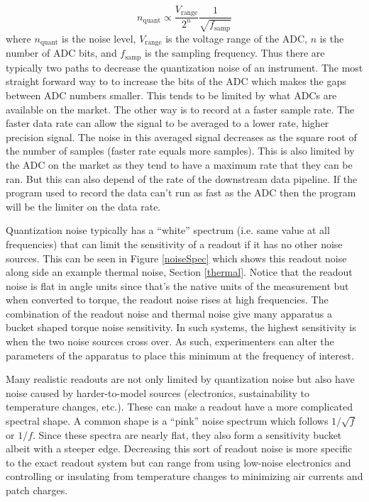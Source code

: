 \documentclass{book}
\begin{document}
\begin{equation}
n_\text{quant} \propto \frac{V_{\text{range}}}{2^n} \frac{1}{\sqrt{f_\text{samp}}}
\end{equation}
where $n_\text{quant}$ is the noise level, $V_{\text{range}}$ is the voltage range of the ADC, $n$ is the number of ADC bits, and $f_\text{samp}$ is the sampling frequency. Thus there are typically two paths to decrease the quantization noise of an instrument. The most straight forward way to to increase the bits of the ADC which makes the gaps between ADC numbers smaller. This tends to be limited by what ADCs are available on the market. The other way is to record at a faster sample rate. The faster data rate can allow the signal to be averaged to a lower rate, higher precision signal. The noise in this averaged signal decreases as the square root of the number of samples (faster rate equals more samples). This is also limited by the ADC on the market as they tend to have a maximum rate that they can be ran. But this can also depend of the rate of the downstream data pipeline. If the program used to record the data can't run as fast as the ADC then the program will be the limiter on the data rate.

Quantization noise typically has a ``white'' spectrum (i.e. same value at all frequencies) that can limit the sensitivity of a readout if it has no other noise sources. This can be seen in Figure \ref{noiseSpec} which shows this readout noise along side an example thermal noise, Section \ref{thermal}. Notice that the readout noise is flat in angle units since that's the native units of the measurement but when converted to torque, the readout noise rises at high frequencies. The combination of the readout noise and thermal noise give many apparatus a bucket shaped torque noise sensitivity. In such systems, the highest sensitivity is when the two noise sources cross over. As such, experimenters can alter the parameters of the apparatus to place this minimum at the frequency of interest.

Many realistic readouts are not only limited by quantization noise but also have noise caused by harder-to-model sources (electronics, sustainability to temperature changes, etc.). These can make a readout have a more complicated spectral shape. A common shape is a ``pink'' noise spectrum which follows $1/\sqrt{f}$ or $1/f$. Since these spectra are nearly flat, they also form a sensitivity bucket albeit with a steeper edge. Decreasing this sort of readout noise is more specific to the exact readout system but can range from using low-noise electronics and controlling or insulating from temperature changes to minimizing air currents and patch charges.
\end{document}
